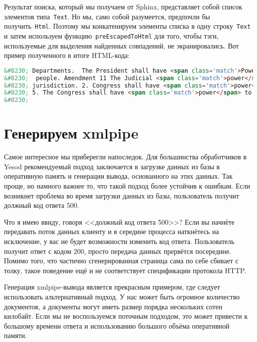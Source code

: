 Результат поиска, который мы получаем от Sphinx, представляет собой список элементов типа~\lstinline'Text'. Но мы, само собой разумеется, предпочли бы получить~\lstinline'Html'. Поэтому мы конкатенируем элементы списка в одну строку~\lstinline'Text' и затем используем функцию~\lstinline'preEscapedToHtml' для того, чтобы тэги, используемые для выделения найденных совпадений, не экранировались. Вот пример полученного в итоге HTML-кода:
\begin{lstlisting}[language=HTML]
&#8230; Departments.  The President shall have <span class='match'>Power</span> to fill up all Vacancies
&#8230;  people. Amendment 11 The Judicial <span class='match'>power</span> of the United States shall
&#8230; jurisdiction. 2. Congress shall have <span class='match'>power</span> to enforce this article by
&#8230; 5. The Congress shall have <span class='match'>power</span> to enforce, by appropriate legislation
&#8230;
\end{lstlisting}

\section{Генерируем xmlpipe}
Самое интересное мы приберегли напоследок. Для большинства обработчиков в Yesod рекомендуемый подход заключается в загрузке данных из базы в оперативную память и генерации вывода, основанного на этих данных. Так проще, но намного важнее то, что такой подход более устойчив к ошибкам. Если возникнет проблема во время загрузки данных из базы, пользователь получит должный код ответа 500.

\begin{remark}
Что я имею ввиду, говоря <<должный код ответа 500>>? Если вы начнёте передавать поток данных клиенту и в середине процесса наткнётесь на исключение, у вас не будет возможности изменить код ответа. Пользователь получит ответ с кодом 200, просто передача данных прервётся посередине. Помимо того, что частично сгенерированная страница сама по себе сбивает с толку, такое поведение ещё и не соответствует спецификации протокола HTTP.
\end{remark}

Генерация xmlpipe-вывода является прекрасным примером, где следует использовать альтернативный подход. У нас может быть огромное количество документов, а документы могут иметь размер порядка нескольких сотен килобайт. Если мы не воспользуемся поточным подходом, это может привести к большому времени ответа и использованию большого объёма оперативной памяти.

